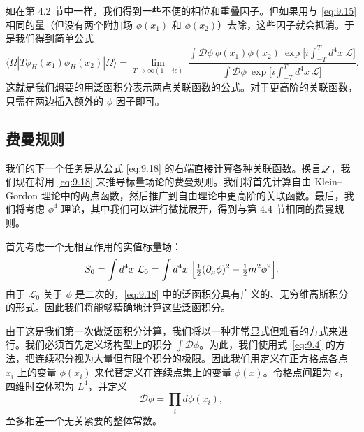 如在第 4.2 节中一样，我们得到一些不便的相位和重叠因子。但如果用与 \eqref{eq:9.15} 相同的量（但没有两个附加场 $\phi(x_1)$ 和 $\phi(x_2)$）去除，这些因子就会抵消。于是我们得到简单公式
\begin{equation}
  \langle\Omega|T\phi_H(x_1)\phi_H(x_2)|\Omega\rangle
  = \lim_{T\to\infty(1-i\epsilon)}\
    \frac{\int\mathcal{D}\phi\ \phi(x_1)\phi(x_2)\ \exp\bigl[
      i\int_{-T}^{T}d^4x\ \mathcal{L} \bigr]}
      {\int\mathcal{D}\phi\ \exp\bigl[ i\int_{-T}^{T}d^4x\ \mathcal{L} \bigr]} .
  \label{eq:9.18}
\end{equation}
这就是我们想要的用泛函积分表示两点关联函数的公式。对于更高阶的关联函数，只需在两边插入额外的 $\phi$ 因子即可。

\subsection{费曼规则}

我们的下一个任务是从公式 \eqref{eq:9.18} 的右端直接计算各种关联函数。换言之，我们现在将用 \eqref{eq:9.18} 来推导标量场论的费曼规则。我们将首先计算自由 Klein--Gordon 理论中的两点函数，然后推广到自由理论中更高阶的关联函数。最后，我们将考虑 $\phi^4$ 理论，其中我们可以进行微扰展开，得到与第 4.4 节相同的费曼规则。

首先考虑一个无相互作用的实值标量场：
\begin{equation}
  S_0 = \int d^4x\ \mathcal{L}_0
  = \int d^4x\ \Bigl[ \tfrac{1}{2}(\partial_\mu\phi)^2
    - \tfrac{1}{2}m^2\phi^2 \Bigr].
  \label{eq:9.19}
\end{equation}
由于 $\mathcal{L}_0$ 关于 $\phi$ 是二次的，\eqref{eq:9.18} 中的泛函积分具有广义的、无穷维高斯积分的形式。因此我们将能够精确地计算这些泛函积分。

由于这是我们第一次做泛函积分计算，我们将以一种非常显式但难看的方式来进行。我们必须首先定义场构型上的积分 $\int\mathcal{D}\phi$。为此，我们使用式~\eqref{eq:9.4} 的方法，把连续积分视为大量但有限个积分的极限。因此我们用定义在正方格点各点 $x_i$ 上的变量 $\phi(x_i)$ 来代替定义在连续点集上的变量 $\phi(x)$。令格点间距为 $\epsilon$，四维时空体积为 $L^4$，并定义
\begin{equation}
  \mathcal{D}\phi = \prod_i d\phi(x_i),
  \label{eq:9.20}
\end{equation}
至多相差一个无关紧要的整体常数。

